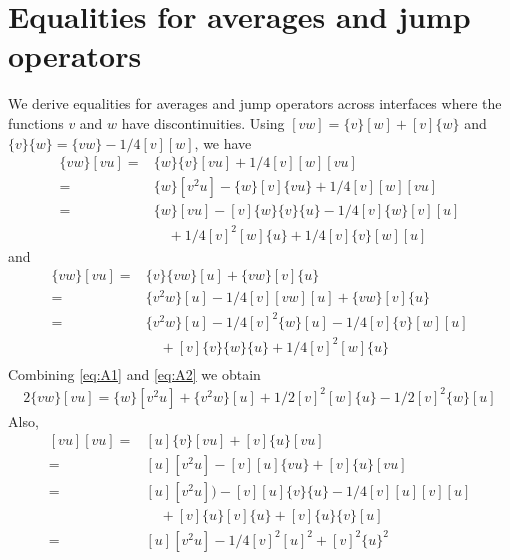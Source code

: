 \documentclass[10pt]{article}
\numberwithin{equation}{section}
\theoremstyle{plain}
\theoremstyle{definition}
\theoremstyle{remark}
\begin{document}



\appendix

\section{Equalities for averages and jump operators}
We derive equalities for averages and jump operators across interfaces where the functions $v$ and $w$ have discontinuities.
  Using $[vw] = \{v\}[w] + [v]\{w\}$ and $\{v\}\{w\} = \{vw\}-1/4[v][w]$, we have
  \begin{equation}
    \begin{aligned}\label{eq:A1}
       \{v w\}[vu] = & \{w\}\{v\}[vu]+1/4[v][w][vu]\\
       = &\{w\}[v^2u]-\{w\}[v]\{vu\}+1/4[v][w][vu] \\
       = &\{w\}[vu]-[v]\{w\}\{v\}\{u\}-1/4[v]\{w\}[v][u] \\
       &\quad +1/4[v]^2[w]\{u\}+1/4[v]\{v\}[w][u]
    \end{aligned}
  \end{equation}
  and
  \begin{equation}
    \begin{aligned}\label{eq:A2}
       \{vw\}[vu] =& \{v\}\{vw\}[u] + \{vw\}[v]\{u\} \\
       = &\{v^2w\}[u]-1/4[v][vw][u] + \{vw\}[v]\{u\} \\
       = &\{v^2w\}[u] -1/4[v]^2\{w\}[u]-1/4[v]\{v\}[w][u] \\
       &\quad+ [v]\{v\}\{w\}\{u\}+1/4 [v]^2[w]\{u\} \\
    \end{aligned}
  \end{equation}
  Combining \eqref{eq:A1} and \eqref{eq:A2} we obtain
  \begin{equation}
    \begin{aligned}\label{eq:A3}
      2\{vw\}[vu] = \{w\}[v^2u]+\{v^2w\}[u]+1/2 [v]^2[w]\{u\}-1/2[v]^2\{w\}[u]
    \end{aligned}
  \end{equation}
  Also,
  \begin{equation}
    \begin{aligned}\label{eq:A4}
      [vu][vu] =& [u]\{v\}[vu]+[v]\{u\}[vu] \\
      =& [u][v^2u]-[v][u]\{vu\}+[v]\{u\}[vu] \\
      =& [u][v^2u]) -[v][u]\{v\}\{u\}-1/4[v][u][v][u] \\
      & \quad +[v]\{u\}[v]\{u\}+[v]\{u\}\{v\}[u] \\
      =& [u][v^2u] -1/4[v]^2[u]^2 +[v]^2\{u\}^2
    \end{aligned}
  \end{equation}
\end{document}
